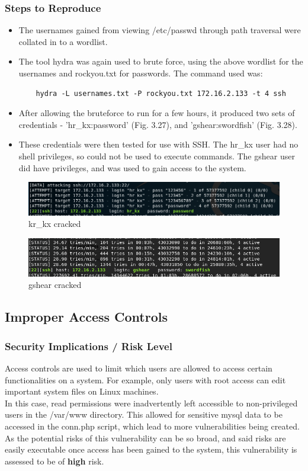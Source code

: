\documentclass{report}
\begin{document}
\subsubsection{Steps to Reproduce}
\begin{itemize}
	\item The usernames gained from viewing /etc/passwd through path traversal were collated in to a wordlist.
	\item The tool hydra was again used to brute force, using the above wordlist for the usernames and rockyou.txt for passwords. The command used was:
	\begin{verbatim}
	hydra -L usernames.txt -P rockyou.txt 172.16.2.133 -t 4 ssh
	\end{verbatim}
	\item After allowing the bruteforce to run for a few hours, it produced two sets of credentials - 'hr\_kx:password' (Fig. 3.27), and 'gshear:swordfish' (Fig. 3.28).
	\item These credentials were then tested for use with SSH. The hr\_kx user had no shell privileges, so could not be used to execute commands. The gshear user did have privileges, and was used to gain access to the system.
\end{itemize}
\begin{figure}[!htb]
	\centering
	\includegraphics[scale=0.5]{img/133ssh1.png}
	\caption{kr\_kx cracked}
\end{figure}
\begin{figure}[!htb]
	\centering
	\includegraphics[scale=0.6]{img/133ssh2.png}
	\caption{gshear cracked}
\end{figure}
\pagebreak

\subsection{Improper Access Controls}
\subsubsection{Security Implications / Risk Level}
Access controls are used to limit which users are allowed to access certain functionalities on a system. For example, only users with root access can edit important system files on Linux machines.\\
In this case, read permissions were inadvertently left accessible to non-privileged users in the /var/www directory. This allowed for sensitive mysql data to be accessed in the conn.php script, which lead to more vulnerabilities being created.\\
As the potential risks of this vulnerability can be so broad, and said risks are easily executable once access has been gained to the system, this vulnerability is assessed to be of \textbf{high} risk.
\end{document}
